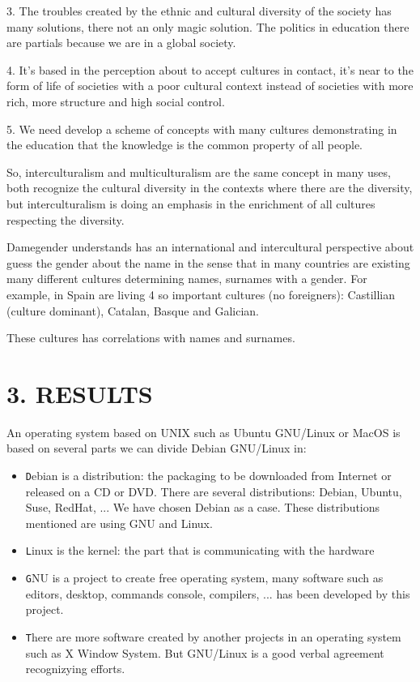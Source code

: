 \documentclass[fleqn,10pt,lineno]{wlpeerj} %
\begin{document}
3. The troubles created by the ethnic and cultural diversity of the
society has many solutions, there not an only magic solution. The
politics in education there are partials because we are in a global
society.

4. It's based in the perception about to accept cultures in contact,
it's near to the form of life of societies with a poor cultural
context instead of societies with more rich, more structure and high
social control.

5. We need develop a scheme of concepts with many cultures
demonstrating in the education that the knowledge is the common
property of all people.

So, interculturalism and multiculturalism are the same concept in many
uses, both recognize the cultural diversity in the contexts where
there are the diversity, but interculturalism is doing an emphasis in
the enrichment of all cultures respecting the diversity.

Damegender understands has an international and intercultural
perspective about guess the gender about the name in the sense that in
many countries are existing many different cultures determining names,
surnames with a gender. For example, in Spain are living 4 so
important cultures (no foreigners): Castillian (culture dominant),
Catalan, Basque and Galician.

These cultures has correlations with names and surnames.

\section*{3. RESULTS}

An operating system based on UNIX such as Ubuntu GNU/Linux or MacOS is
based on several parts we can divide Debian GNU/Linux in:

\begin{itemize}
	\item \texttt Debian is a distribution: the packaging to
          be downloaded from Internet or released on a CD or
          DVD. There are several distributions: Debian, Ubuntu, Suse,
          RedHat, ... We have chosen Debian as a case. These
          distributions mentioned are using GNU and Linux.
	\item \texttt Linux is the kernel: the part that is
          communicating with the hardware
	\item \texttt GNU is a project to create free operating
          system, many software such as editors, desktop, commands
          console, compilers, ... has been developed by this project.
	\item \texttt There are more software created by another
          projects in an operating system such as X Window System. But
          GNU/Linux is a good verbal agreement recognizying efforts.
\end{itemize}
\end{document}

